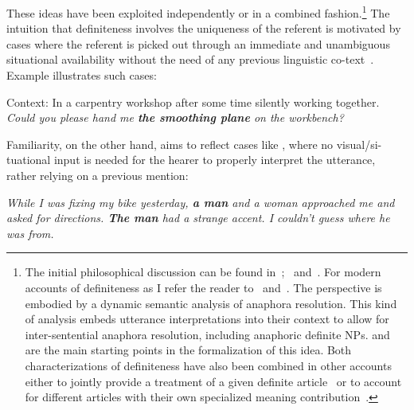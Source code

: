\documentclass[output=paper
,modfonts
,nonflat]{langsci/langscibook}
\begin{document}
These ideas have been exploited independently or in a combined fashion.\footnote{The initial philosophical discussion can be found in~\citet{Frege1892};~\citet{Russell1905} and~\citet{Strawson1950}. For modern accounts of definiteness as  I refer the reader to~\citet{Hawkins1978,Hawkins1991} and~\citet{Abbott1999}. The  perspective is embodied by a dynamic semantic analysis of anaphora resolution. This kind of analysis embeds utterance interpretations into their  context to allow for inter-sentential anaphora resolution, including anaphoric definite NPs.  \citep{Kamp1981} and ~\citep{Heim1982} are the main starting points in the formalization of this idea. Both characterizations of definiteness have also been combined in other accounts either to jointly provide a treatment of a given definite article~\citep{Farkas2002,Roberts2003} or to account for different articles with their own specialized meaning contribution~\citep{Schwarz2009,Schwarz2013}.} The intuition that definiteness involves the uniqueness of the referent is motivated by cases where the referent is picked out through an immediate and unambiguous situational availability without the need of any previous linguistic co-text~\citep[see][103, 110]{Hawkins1978}. Example  illustrates such cases:

\ea \label{ex:pico:2}
Context: In a carpentry workshop after some time silently working together. \\  
\textit{Could you please hand me \textbf{the smoothing plane} on the workbench?}
\z

Familiarity, on the other hand, aims to reflect cases like , where no visual/si\hyp{}tuational input is needed for the hearer to properly interpret the utterance, rather relying on a previous mention:

\ea \label{ex:pico:3}
\textit{While I was fixing my bike yesterday, \textbf{a man} and a woman approached me and asked for directions. \textbf{The man} had a strange accent. I couldn't guess where he was from.}
\z
\end{document}

